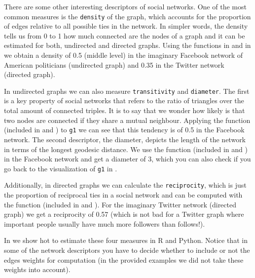 
There are some other interesting descriptors of social networks. One of the most common measures is the \texttt{density} of the graph, which accounts for the proportion of edges relative to all possible ties in the network. In simpler words, the density tells us from 0 to 1 how much connected are the nodes of a graph and it can be estimated for both, undirected and directed graphs. Using the functions  in  and  in  we obtain a density of 0.5 (middle level) in the imaginary Facebook network of American politicians (undirected graph) and 0.35 in the Twitter network (directed graph). 

In undirected graphs we can also measure \texttt{transitivity} and \texttt{diameter}. The first is a key property of social networks that refers to the ratio of triangles over the total amount of connected triples. It is to say that we wonder how likely is that two nodes are connected if they share a mutual neighbour. Applying the function  (included in  and ) to \texttt{g1} we can see that this tendency is of 0.5 in the Facebook network. The second descriptor, the diameter, depicts the length of the network in terms of the longest geodesic distance. We use the function  (included in  and ) in the Facebook network and get a diameter of 3, which you can also check if you go back to the visualization of \texttt{g1} in . 

Additionally, in directed graphs we can calculate the \texttt{reciprocity}, which is just the proportion of reciprocal ties in a social network and can be computed with the function  (included in  and ). For the imaginary Twitter network (directed graph) we get a reciprocity of 0.57 (which is not bad for a Twitter graph where important people usually have much more followers than follows!).

In  we show hot to estimate these four measures in R and Python. Notice that in some of the network descriptors you have to decide whether to include or not the edges weights for computation (in the provided examples we did not take these weights into account).


